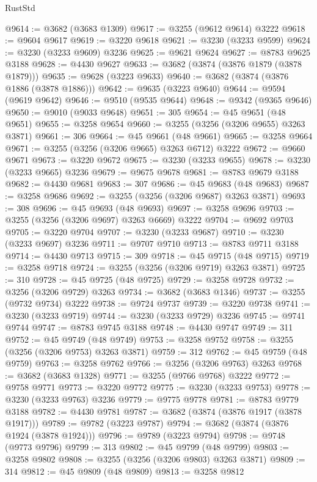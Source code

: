 \begin{lexlean}{RustStd}
\begin{coremodule}
{\begin{coremodule}
{{{{{{{{{{{{{{{{{{{{{{{{{{{{{{{{{{{{{@9614 := @3682 (@3683 @1309)
@9617 := @3255 (@9612 @9614) @3222
@9618 := @9604 @9617
@9619 := @3220 @9618
@9621 := @3230 (@3233 @9599)
@9624 := @3230 (@3233 @9609) @3236
@9625 := @9621 @9624
@9627 := @8783 @9625 @3188
@9628 := @4430 @9627
@9633 := @3682 (@3874 (@3876 @1879 (@3878 @1879)))
@9635 := @9628 (@3223 @9633)
@9640 := @3682 (@3874 (@3876 @1886 (@3878 @1886)))
@9642 := @9635 (@3223 @9640)
@9644 := @9594 (@9619 @9642)
@9646 := @9510 (@9535 @9644)
@9648 := @9342 (@9365 @9646)
@9650 := @9010 (@9033 @9648)
@9651 := 305
@9654 := @45 @9651 (@48 @9651)
@9655 := @3258 @9654
@9660 := @3255 (@3256 (@3206 @9655) @3263 @3871)
@9661 := 306
@9664 := @45 @9661 (@48 @9661)
@9665 := @3258 @9664
@9671 := @3255 (@3256 (@3206 @9665) @3263 @6712) @3222
@9672 := @9660 @9671
@9673 := @3220 @9672
@9675 := @3230 (@3233 @9655)
@9678 := @3230 (@3233 @9665) @3236
@9679 := @9675 @9678
@9681 := @8783 @9679 @3188
@9682 := @4430 @9681
@9683 := 307
@9686 := @45 @9683 (@48 @9683)
@9687 := @3258 @9686
@9692 := @3255 (@3256 (@3206 @9687) @3263 @3871)
@9693 := 308
@9696 := @45 @9693 (@48 @9693)
@9697 := @3258 @9696
@9703 := @3255 (@3256 (@3206 @9697) @3263 @6669) @3222
@9704 := @9692 @9703
@9705 := @3220 @9704
@9707 := @3230 (@3233 @9687)
@9710 := @3230 (@3233 @9697) @3236
@9711 := @9707 @9710
@9713 := @8783 @9711 @3188
@9714 := @4430 @9713
@9715 := 309
@9718 := @45 @9715 (@48 @9715)
@9719 := @3258 @9718
@9724 := @3255 (@3256 (@3206 @9719) @3263 @3871)
@9725 := 310
@9728 := @45 @9725 (@48 @9725)
@9729 := @3258 @9728
@9732 := @3256 (@3206 @9729) @3263
@9734 := @3682 (@3683 @1346)
@9737 := @3255 (@9732 @9734) @3222
@9738 := @9724 @9737
@9739 := @3220 @9738
@9741 := @3230 (@3233 @9719)
@9744 := @3230 (@3233 @9729) @3236
@9745 := @9741 @9744
@9747 := @8783 @9745 @3188
@9748 := @4430 @9747
@9749 := 311
@9752 := @45 @9749 (@48 @9749)
@9753 := @3258 @9752
@9758 := @3255 (@3256 (@3206 @9753) @3263 @3871)
@9759 := 312
@9762 := @45 @9759 (@48 @9759)
@9763 := @3258 @9762
@9766 := @3256 (@3206 @9763) @3263
@9768 := @3682 (@3683 @1328)
@9771 := @3255 (@9766 @9768) @3222
@9772 := @9758 @9771
@9773 := @3220 @9772
@9775 := @3230 (@3233 @9753)
@9778 := @3230 (@3233 @9763) @3236
@9779 := @9775 @9778
@9781 := @8783 @9779 @3188
@9782 := @4430 @9781
@9787 := @3682 (@3874 (@3876 @1917 (@3878 @1917)))
@9789 := @9782 (@3223 @9787)
@9794 := @3682 (@3874 (@3876 @1924 (@3878 @1924)))
@9796 := @9789 (@3223 @9794)
@9798 := @9748 (@9773 @9796)
@9799 := 313
@9802 := @45 @9799 (@48 @9799)
@9803 := @3258 @9802
@9808 := @3255 (@3256 (@3206 @9803) @3263 @3871)
@9809 := 314
@9812 := @45 @9809 (@48 @9809)
@9813 := @3258 @9812
}}}}}}}}}}}}}}}}}}}}}}}}}}}}}}}}}}}}}
\end{coremodule}}
\end{coremodule}
\end{lexlean}
